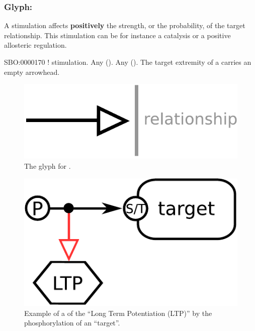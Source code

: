 
\subsubsection{Glyph: }\label{sec:stimulation}
\color{blue}

A stimulation affects \textbf{positively} the strength, or the probability, of the target relationship. This stimulation can be for instance a catalysis or a positive allosteric regulation.

\begin{glyphDescription}
 \glyphSboTerm SBO:0000170 ! stimulation.
 \glyphOrigin Any  ().
 \glyphTarget Any  ().
 \glyphEndPoint The target extremity of a  carries an empty arrowhead.
 \end{glyphDescription}

\begin{figure}[H]
  \centering
  \includegraphics[scale = 0.5]{images/stimulation}
  \caption{The \PD glyph for .}
  \label{fig:stimulation}
\end{figure}

\begin{figure}[H]
  \centering
  \includegraphics[scale = 0.5]{examples/ex-stimulation}
  \caption{Example of a  of the  ``Long Term Potentiation (LTP)'' by the phosphorylation of an  ``target''.}
  \label{fig:ex-stimulation}
\end{figure}

\normalcolor



